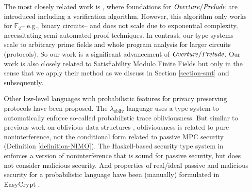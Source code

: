 
The most closely related work is \cite{skalka-near-ppdp24}, where
foundations for $\mathit{Overture}/\mathit{Prelude}$ are introduced including a
verification algorithm. However, this algorithm only works for
$\mathbb{F}_2$-- e.g., binary circuits-- and does not scale due to
exponential complexity, necessitating semi-automated proof
techniques. In contrast, our type systems scale to arbitrary prime
fields and whole program analysis for larger circuits (protocols). So
our work is a significant advancement of $\mathit{Overture}/\mathit{Prelude}$.  Our
work is also closely related to Satisfiability Modulo Finite Fields
\cite{SMFF} but only in the sense that we apply their method as we
discuss in Section \ref{section-smt} and subsequently.

Other low-level languages with probabilistic features for privacy
preserving protocols have been proposed. The
$\lambda_{\mathrm{obliv}}$ language \cite{darais2019language} uses a
type system to automatically enforce so-called probabilistic trace
obliviousness.  But similar to previous work on oblivious data
structures \cite{10.1145/3498713}, obliviousness is related to pure
noninterference, not the conditional form related to passive MPC
security (Definition \ref{definition-NIMO}). The Haskell-based security
type system in \cite{6266151} enforces a version of noninterference
that is sound for passive security, but does not consider malicious
security. And properties of real/ideal passive and malicious security
for a probabilistic language have been (manually) formulated in
EasyCrypt \cite{8429300}.


